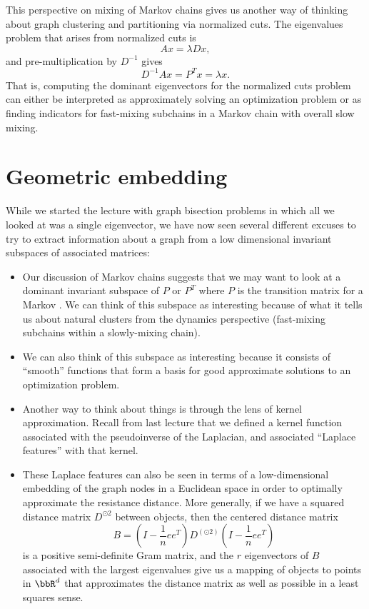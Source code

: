 \documentclass[12pt, leqno]{article} %
\begin{document}
This perspective on mixing of Markov chains gives us another way of
thinking about graph clustering and partitioning via normalized cuts.
The eigenvalues problem that arises from normalized cuts is
\[
  Ax = \lambda D x,
\]
and pre-multiplication by $D^{-1}$ gives
\[
  D^{-1} A x = P^T x = \lambda x.
\]
That is, computing the dominant eigenvectors for the normalized cuts
problem can either be interpreted as approximately solving an
optimization problem or as finding indicators for fast-mixing
subchains in a Markov chain with overall slow mixing.

\section{Geometric embedding}

While we started the lecture with graph bisection problems in which
all we looked at was a single eigenvector, we have now seen several
different excuses to try to extract information about a graph
from a low dimensional invariant subspaces of associated matrices:
\begin{itemize}
\item
  Our discussion of Markov chains suggests
  that we may want to look at a dominant invariant subspace of $P$ or
  $P^T$ where $P$ is the transition matrix for a Markov .  We can
  think of this subspace as interesting because of what it tells us
  about natural clusters from the dynamics perspective (fast-mixing
  subchains within a slowly-mixing chain).
\item
  We can also think of this subspace as interesting because it
  consists of ``smooth'' functions that form a basis for good
  approximate solutions to an optimization problem.
\item
  Another way to think about things is through the lens of kernel
  approximation.  Recall from last lecture that we defined a kernel
  function associated with the pseudoinverse of the Laplacian, and
  associated ``Laplace features'' with that kernel.
\item
  These Laplace features can also be seen in terms of a low-dimensional
  embedding of the graph nodes in a Euclidean space in order to
  optimally approximate the resistance distance.  More generally, if
  we have a squared distance matrix $D^{\odot 2}$ between objects, then
  the centered distance matrix
  \[
    B = \left(I-\frac{1}{n} ee^T \right) D^{(\odot 2)} \left(
    I-\frac{1}{n} ee^T \right)
  \]
  is a positive semi-definite Gram matrix, and the $r$
  eigenvectors of $B$ associated with the largest eigenvalues
  give us a mapping of objects to points in $\bbR^d$ that
  approximates the distance matrix as well as possible in a least
  squares sense.
\end{itemize}
\end{document}
